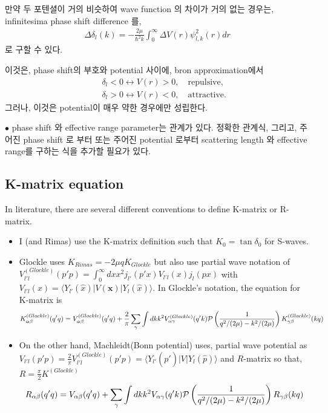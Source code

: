 \documentclass[10pt]{book}
\def\bm{\boldsymbol}
\newcommand{\bea}{\begin{eqnarray}}
\newcommand{\eea}{\end{eqnarray}}
\newcommand{\no}{\nonumber \\}
\def\vx{{\bm x}}
\def\la{\langle}
\def\ra{\rangle}
\begin{document}
만약 두 포텐셜이 거의 비슷하여 wave function 의 차이가 거의 없는 경우는, infinitesima
phase shift difference 를,
\bea
\Delta \delta_l(k)=-\frac{2\mu}{\hbar^2 k}\int_0^\infty \Delta V(r)\psi^2_{l,k}(r) dr
\eea
로 구할 수 있다.

이것은, phase shift의 부호와 potential 사이에, bron approximation에서 
\bea 
& &\delta_l<0 \leftrightarrow V(r) >0,\quad \mbox{repulsive},\no 
& &\delta_l>0 \leftrightarrow V(r) <0,\quad \mbox{attractive}. 
\eea 
그러나, 이것은 potential이 매우 약한 경우에만 성립한다. 

$\bullet$ phase shift 와 effective range parameter는 관계가 있다. 정확한 관계식, 그리고, 
주어진 phase shift 로 부터 또는 주어진 potential 로부터 scattering length 와 effective range를 
구하는 식을 추가할 필요가 있다.

\subsection{K-matrix equation}
In literature, there are several different conventions to
define K-matrix or R-matrix.
\begin{itemize}
\item
I (and Rimas) use the K-matrix definition such that 
$K_0=\tan\delta_0$ for S-waves.
\item
Glockle uses $K_{Rimas}=-2\mu q K_{Glockle}$
but also use partial wave notation of 
$V_{l'l}^{(Glockle)}(p'p)
=\int_0^\infty dx x^2 j_{l'}(p'x) V_{l'l}(x) j_l(px)$
with $V_{l'l}(x)=\la Y_{l'}(\hat{x})|V(\vx)|Y_l(\hat{x})\ra$.
In Glockle's notation, the equation
for K-matrix is
\bea
K^{(Glockle)}_{\alpha\beta}(q'q)
=V^{(Glockle)}_{\alpha\beta}(q'q)+\frac{2}{\pi}\sum_{\gamma}\int dk k^2 
 V^{(Glockle)}_{\alpha\gamma}(q' k) {\cal P}\left(\frac{1}{q^2/(2\mu)-k^2/(2\mu)}\right)
 K^{(Glockle)}_{\gamma\beta}(kq)
\eea
\item
On the other hand, Machleidt(Bonn potential) uses,
partial wave potential as $V_{l'l}(p'p)=\frac{2}{\pi}V^{(Glockle)}_{l'l}(p'p)
=\la Y_{l'}(\hat{p'})|V|Y_{l}(\hat{p})\ra$
and $R$-matrix so that, $R=\frac{\pi}{2}K^{(Glockle)}$
\bea
R_{\alpha\beta}(q'q)
=V_{\alpha\beta}(q'q)+\sum_{\gamma}\int dk k^2 
 V_{\alpha\gamma}(q' k) {\cal P}\left(\frac{1}{q^2/(2\mu)-k^2/(2\mu)}\right)
 R_{\gamma\beta}(kq)
\eea
\end{itemize}
\end{document}
